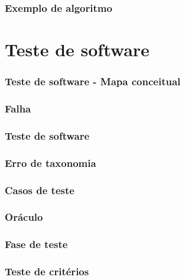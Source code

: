 \documentclass[utf8, usepdftitle=false, svgnames, color={table,
fixpdftex, hyperref, fixinclude, xcdraw}, t, brazil]{beamer}
\begin{document}
 \section{Exemplo de algoritmo}
 
 
 \part{Teste de software}
 
 \section{Teste de software - Mapa conceitual}
 
 
 \section{Falha}
 
 
 \section{Teste de software}
 
 
 \section{Erro de taxonomia}
 
 
 \section{Casos de teste}
 
 
 \section{Oráculo}
 
 
 \section{Fase de teste}
 
 
 \section{Teste de critérios}
 
 
\end{document}
